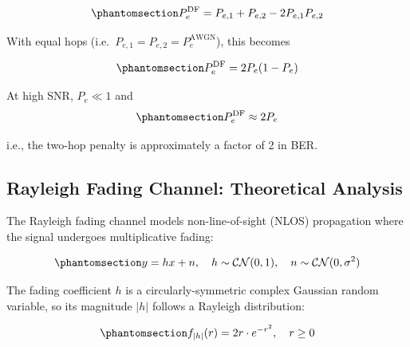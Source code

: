 \begin{equation}\protect\phantomsection\label{eq:df-ber-awgn}{P_e^{\text{DF}} = P_{e,1} + P_{e,2} - 2P_{e,1}P_{e,2}
}\end{equation}

With equal hops (i.e.\ \(P_{e,1} = P_{e,2} = P_e^{\text{AWGN}}\)), this becomes

\begin{equation}\protect\phantomsection\label{eq:equal-hop-snr}{P_e^{\text{DF}} = 2P_e(1 - P_e)}
\end{equation}

At high SNR, \(P_e \ll 1\) and
\begin{equation}\protect\phantomsection\label{eq:df-high-snr-two-hop-penalty}{P_e^{\text{DF}} \approx 2P_e}
\end{equation}
i.e., the two-hop penalty is approximately a factor of 2 in BER.

\subsection{Rayleigh Fading Channel: Theoretical Analysis}\label{sec:rayleigh-fading-channel-theoretical-analysis}

The Rayleigh fading channel models non-line-of-sight (NLOS) propagation where the signal undergoes multiplicative fading:

\begin{equation}\protect\phantomsection\label{eq:rayleigh-channel}{y = hx + n, \quad h \sim \mathcal{CN}(0, 1), \quad n \sim \mathcal{CN}(0, \sigma^2)
}\end{equation}

The fading coefficient \(h\) is a circularly-symmetric complex Gaussian random variable, so its magnitude \(|h|\) follows a Rayleigh distribution:

\begin{equation}\protect\phantomsection\label{eq:rayleigh-pdf}{f_{|h|}(r) = 2r \cdot e^{-r^2}, \quad r \geq 0
}\end{equation}

